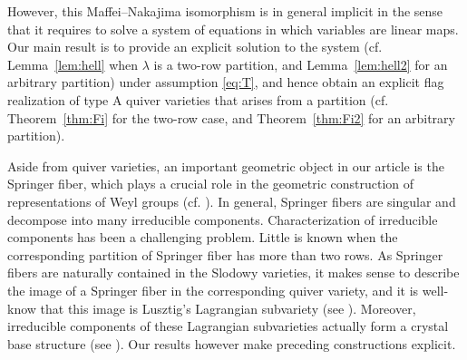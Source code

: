 \documentclass[11pt,reqno]{amsart}
\numberwithin{equation}{section}
\theoremstyle{definition}
\newcommand{\ld}{\lambda}
\begin{document}
However, this Maffei--Nakajima isomorphism is in general implicit in the sense that it requires to solve a system of equations in which variables are linear maps.
Our main result is to provide an explicit solution to the system (cf. Lemma~\ref{lem:hell} when $\ld$ is a two-row partition, and Lemma~\ref{lem:hell2} for an arbitrary partition) under assumption \eqref{eq:T}, and hence obtain an explicit flag realization of type A quiver varieties that arises from a partition (cf. Theorem~\ref{thm:Fi} for the two-row case, and Theorem~\ref{thm:Fi2} for an arbitrary partition).

Aside from quiver varieties, an important geometric object in our article is the Springer fiber, which plays a crucial role in the geometric construction of representations of Weyl groups (cf. \cite{Spr76, Spr78}). 
In general, Springer fibers are singular and decompose into many irreducible components.
Characterization of irreducible components has been a challenging problem. 
Little is known when the corresponding partition of Springer fiber has more than two rows.
As Springer fibers are naturally contained in the Slodowy varieties, it makes sense to describe the image of a Springer fiber in the corresponding quiver variety, and it is well-know that this image is Lusztig's Lagrangian subvariety (see \cite{Lu91, Lu98}). %
Moreover, irreducible components of these Lagrangian subvarieties actually form a crystal base structure (see \cite{Sai02, KS19}). Our results however make preceding constructions explicit. 
\end{document}
